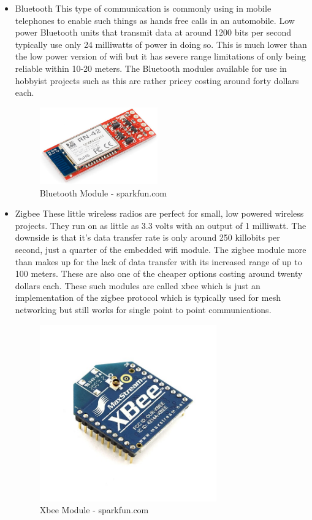 \begin{itemize}
\item Bluetooth
This type of communication is commonly using in mobile telephones to enable such things as hands free calls in an automobile.  Low power Bluetooth units that transmit data at around 1200 bits per second typically use only 24 milliwatts of power in doing so.  This is much lower than the low power version of wifi but it has severe range limitations of only being reliable within 10-20 meters.  The Bluetooth modules available for use in hobbyist projects such as this are rather pricey costing around forty dollars each.
\begin{figure}[H]
\centering
        \includegraphics[width=2.0in] {Images/bluetooth.jpg}
        \caption{Bluetooth Module - sparkfun.com}
        \label{Bluetooth Module}
\end{figure}
\item Zigbee
These little wireless radios are perfect for small, low powered wireless projects.  They run on as little as 3.3 volts with an output of 1 milliwatt.  The downside is that it's data transfer rate is only around 250 killobits per second, just a quarter of the embedded wifi module.  The zigbee module more than makes up for the lack of data transfer with its increased range of up to 100 meters.  These are also one of the cheaper options costing around twenty dollars each.  These such modules are called xbee which is just an implementation of the zigbee protocol which is typically used for mesh networking but still works for single point to point communications.
\begin{figure}[H]
\centering
        \includegraphics[width=3.0in] {Images/xbee.jpg}
        \caption{Xbee Module - sparkfun.com}
        \label{Xbee Module}
\end{figure}

\end{itemize}
